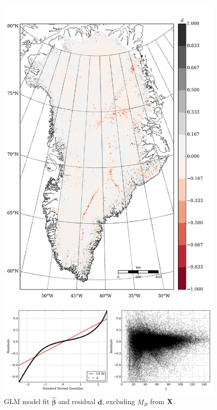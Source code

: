 \begin{figure}
\begin{minipage}[b]{0.47\linewidth}
    \includegraphics[width=1.0\textwidth]{images/greenland/stats/GLM_resid_no_Mb.jpg}
  \end{minipage}
  \begin{minipage}[b]{0.99\linewidth}
    \includegraphics[width=1.0\textwidth]{images/greenland/stats/GLM_resid-NQ_no_Mb.jpg}
  \end{minipage}
  \caption[]{GLM model fit $\bm{\hat{\beta}}$ and residual $\mathbf{d}$, excluding $M_B$ from $\mathbf{X}$.}
\end{figure}


